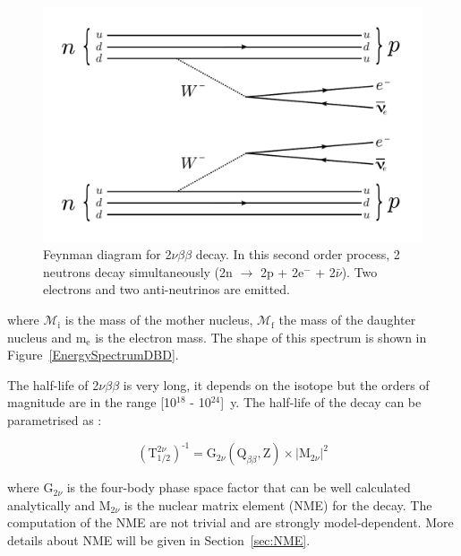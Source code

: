 \documentclass[main.tex]{subfiles}
\begin{document}
\begin{figure}[h!]
\begin{center}
\includegraphics[scale=0.5]{pictures/Chap2/2nubbFeynmanDiagram_v3.pdf}
\caption{Feynman diagram for 2$\nu\beta\beta$ decay. In this second order process, 2 neutrons decay simultaneously (2n $\rightarrow$ 2p + 2e$^-$ + 2$\bar{\nu}$). Two electrons and two anti-neutrinos are emitted.}
\label{2nubbFeynman}
\end{center}
\end{figure}


\bigskip


\NI 


\bigskip


\NI where $\mathcal{M}_\text{i}$ is the mass of the mother nucleus, $\mathcal{M}_\text{f}$ the mass of the daughter nucleus and m$_\text{e}$ is the electron mass. The shape of this spectrum is shown in Figure~\ref{EnergySpectrumDBD}.


\bigskip


\NI The half-life of 2$\nu\beta\beta$ is very long, it depends on the isotope but the orders of magnitude are in the range [10$^{\text{18}}$ - 10$^{\text{24}}$]~y.  The half-life of the decay can be parametrised as : 


\begin{equation}\label{eq:decayRate2nu}
(\text{T}_{\text{1/2}}^{\text{2}\nu})^{\text{-1}} = \text{G}_{\text{2}\nu}(\text{Q}_{\beta\beta}, \text{Z}) \times |\text{M}_{\text{2}\nu}|^\text{2}
\end{equation}


\bigskip


\NI where G$_{\text{2}\nu}$ is the four-body phase space factor that can be well calculated analytically and M$_{\text{2}\nu}$ is the nuclear matrix element (NME) for the decay. The computation of the NME are not trivial and are strongly model-dependent. More details about NME will be given in Section~\ref{sec:NME}.
\end{document}
